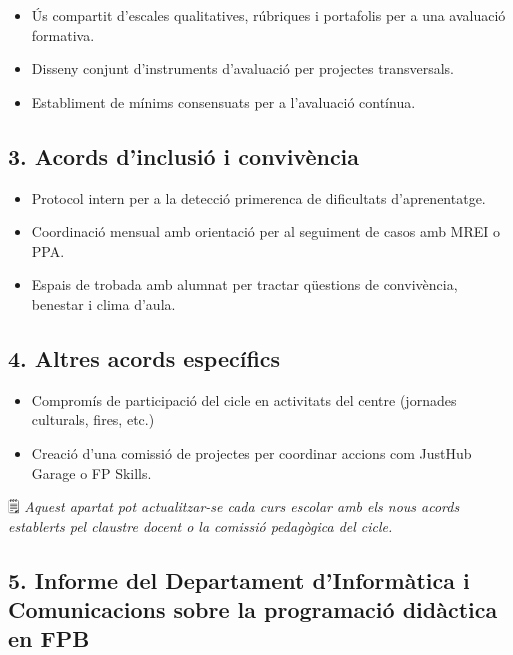 \documentclass[
  paper=a4,
  ,captions=tableheading
]{scrartcl}
\providecommand{\tightlist}{%
  \setlength{\itemsep}{0pt}\setlength{\parskip}{0pt}}
\renewenvironment{quote}{\begin{customblockquote}\list{}{\rightmargin=0em\leftmargin=0em}%
\item\relax\color{blockquote-text}\ignorespaces}{\unskip\unskip\endlist\end{customblockquote}}
\begin{document}
\begin{itemize}
\tightlist
\item
  Ús compartit d'escales qualitatives, rúbriques i portafolis per a una
  avaluació formativa.
\item
  Disseny conjunt d'instruments d'avaluació per projectes transversals.
\item
  Establiment de mínims consensuats per a l'avaluació contínua.
\end{itemize}

\hypertarget{acords-dinclusiuxf3-i-convivuxe8ncia}{%
\subsection{3. Acords d'inclusió i
convivència}\label{acords-dinclusiuxf3-i-convivuxe8ncia}}

\begin{itemize}
\tightlist
\item
  Protocol intern per a la detecció primerenca de dificultats
  d'aprenentatge.
\item
  Coordinació mensual amb orientació per al seguiment de casos amb MREI
  o PPA.
\item
  Espais de trobada amb alumnat per tractar qüestions de convivència,
  benestar i clima d'aula.
\end{itemize}

\hypertarget{altres-acords-especuxedfics}{%
\subsection{4. Altres acords
específics}\label{altres-acords-especuxedfics}}

\begin{itemize}
\tightlist
\item
  Compromís de participació del cicle en activitats del centre (jornades
  culturals, fires, etc.)
\item
  Creació d'una comissió de projectes per coordinar accions com JustHub
  Garage o FP Skills.
\end{itemize}

\begin{quote}
🗒️ \emph{Aquest apartat pot actualitzar-se cada curs escolar amb els
nous acords establerts pel claustre docent o la comissió pedagògica del
cicle.}
\end{quote}

\hypertarget{informe-del-departament-dinformuxe0tica-i-comunicacions-sobre-la-programaciuxf3-diduxe0ctica-en-fpb}{%
\subsection{5. Informe del Departament d'Informàtica i Comunicacions
sobre la programació didàctica en
FPB}\label{informe-del-departament-dinformuxe0tica-i-comunicacions-sobre-la-programaciuxf3-diduxe0ctica-en-fpb}}
\end{document}
